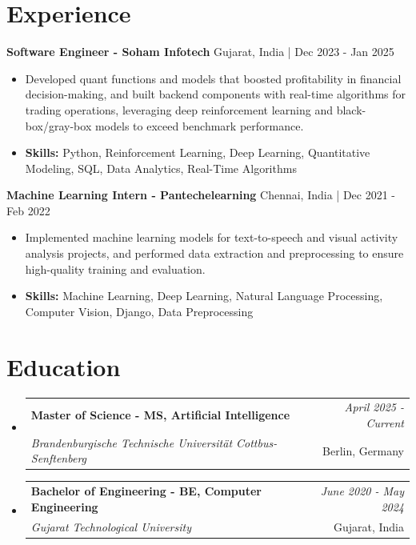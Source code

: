 \documentclass[a4paper,11pt]{article}
\makeatletter
\newcommand{\resumeSubheading}[4]{
\vspace{0.5mm}\item
    \begin{tabular*}{\linewidth}[t]{l@{\extracolsep{\fill}}r}
        \textbf{#1} & \textit{\footnotesize{#4}} \\
        \textit{\footnotesize{#3}} &  \footnotesize{#2}\\
    \end{tabular*}
    \vspace{-2.4mm}
}
\makeatother
\begin{document}
\section{\textbf{Experience}}


\vspace{1mm}
  \textbf{Software Engineer - Soham Infotech} \hfill Gujarat, India | Dec 2023 - Jan 2025
\vspace{-1.5mm} %
\begin{itemize}
  \item Developed quant functions and models that boosted profitability in financial decision-making, and built backend components with real-time algorithms for trading operations, leveraging deep reinforcement learning and black-box/gray-box models to exceed benchmark performance.

\vspace{-2mm}
  \item \textbf{Skills:} Python, Reinforcement Learning, Deep Learning, Quantitative Modeling, SQL, Data Analytics, Real-Time Algorithms
\end{itemize}

\vspace{1mm}
  \textbf{Machine Learning Intern - Pantechelearning} \hfill Chennai, India | Dec 2021 - Feb 2022
\vspace{-1.5mm} %
\begin{itemize}
  \item Implemented machine learning models for text-to-speech and visual activity analysis projects, and performed data extraction and preprocessing to ensure high-quality training and evaluation.
\vspace{-2mm}
  \item \textbf{Skills:} Machine Learning, Deep Learning, Natural Language Processing, Computer Vision, Django, Data Preprocessing
\end{itemize}\section{\textbf{Education}}
\vspace{-0.4mm}

\begin{itemize}[leftmargin=0.15in, label={}]
\resumeSubheading
{Master of Science - MS, Artificial Intelligence }{Berlin, Germany}
{Brandenburgische Technische Universität Cottbus-Senftenberg  }{April 2025 - Current}

\vspace{1.0mm} %
\resumeSubheading
{Bachelor of Engineering - BE, Computer Engineering  }{Gujarat, India}
{Gujarat Technological University }{June 2020 - May 2024}

\end{itemize}
\end{document}
